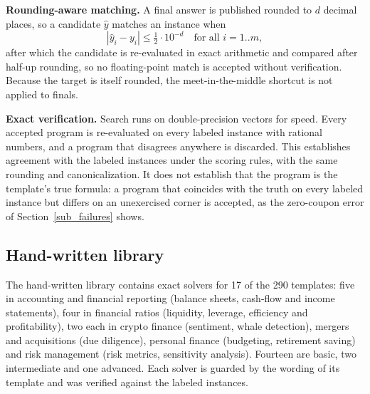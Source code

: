 \documentclass[conference]{IEEEtran}
\begin{document}
\textbf{Rounding-aware matching.} A final answer is published rounded to $d$
decimal places, so a candidate $\hat y$ matches an instance when
\begin{equation}
|\hat y_i-y_i|\le \tfrac12\cdot 10^{-d}\quad\text{for all } i=1..m,
\label{eq_round}
\end{equation}
after which the candidate is re-evaluated in exact arithmetic and compared after
half-up rounding, so no floating-point match is accepted without verification.
Because the target is itself rounded, the meet-in-the-middle shortcut is not
applied to finals.

\textbf{Exact verification.} Search runs on double-precision vectors for speed.
Every accepted program is re-evaluated on every labeled instance with rational
numbers, and a program that disagrees anywhere is discarded. This establishes
agreement with the labeled instances under the scoring rules, with the same
rounding and canonicalization. It does not establish that the program is the
template's true formula: a program that coincides with the truth on every
labeled instance but differs on an unexercised corner is accepted, as the
zero-coupon error of Section~\ref{sub_failures} shows.

\subsection{Hand-written library}
The hand-written library contains exact solvers for 17 of the 290 templates:
five in accounting and financial reporting (balance sheets, cash-flow and income
statements), four in financial ratios (liquidity, leverage, efficiency and
profitability), two each in crypto finance (sentiment, whale detection), mergers
and acquisitions (due diligence), personal finance (budgeting, retirement
saving) and risk management (risk metrics, sensitivity analysis). Fourteen are
basic, two intermediate and one advanced. Each solver is guarded by the wording
of its template and was verified against the labeled instances.
\end{document}
